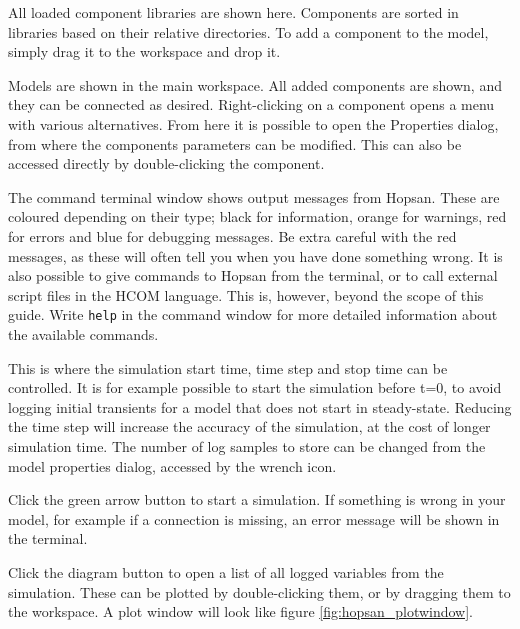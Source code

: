 \documentclass[a4paper,pdftex]{article}
\begin{document}
\begin{tutenumerate}
All loaded component libraries are shown here.
Components are sorted in libraries based on their relative directories.
To add a component to the model, simply drag it to the workspace and drop it.

Models are shown in the main workspace.
All added components are shown, and they can be connected as desired.
Right-clicking on a component opens a menu with various alternatives.
From here it is possible to open the Properties dialog, from where the components parameters can be modified.
This can also be accessed directly by double-clicking the component. 

The command terminal window shows output messages from Hopsan.
These are coloured depending on their type; black for information, orange for warnings, red for errors and blue for debugging messages.
Be extra careful with the red messages, as these will often tell you when you have done something wrong.
It is also possible to give commands to Hopsan from the terminal, or to call external script files in the HCOM language.
This is, however, beyond the scope of this guide.
Write \texttt{help} in the command window for more detailed information about the available commands. 

This is where the simulation start time, time step and stop time can be controlled.
It is for example possible to start the simulation before t=0, to avoid logging initial transients for a model that does not start in steady-state.
Reducing the time step will increase the accuracy of the simulation, at the cost of longer simulation time.
The number of log samples to store can be changed from the model properties dialog, accessed by the wrench icon.

Click the green arrow button to start a simulation.
If something is wrong in your model, for example if a connection is missing, an error message will be shown in the terminal.

Click the diagram button to open a list of all logged variables from the simulation.
These can be plotted by double-clicking them, or by dragging them to the workspace.
A plot window will look like figure \ref{fig:hopsan_plotwindow}.


\end{tutenumerate}
\end{document}
